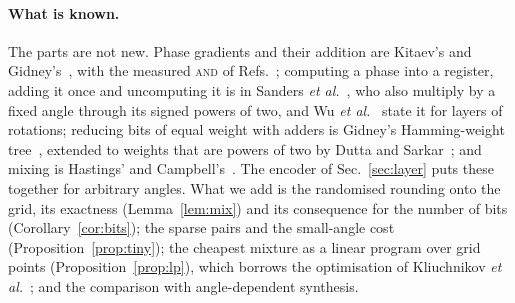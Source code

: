 \documentclass[aps,prx,twocolumn,superscriptaddress,nofootinbib,longbibliography]{revtex4-2}
\theoremstyle{remark}
\newcommand{\AND}{\textup{\textsc{and}}}
\begin{document}
\paragraph*{What is known.} The parts are not new. Phase gradients and their addition are
Kitaev's and Gidney's~\cite{Kitaev2002,Gidney2018}, with the measured \AND{} of
Refs.~\cite{Jones2013,Gidney2018}; computing a phase into a register, adding it once and
uncomputing it is in Sanders \textit{et al.}~\cite{Sanders2020}, who also multiply by a fixed
angle through its signed powers of two, and Wu \textit{et al.}~\cite{Wu2026} state it for layers
of rotations; reducing bits of equal weight with adders is Gidney's Hamming-weight
tree~\cite{Gidney2018,Kivlichan2020}, extended to weights that are powers of two by Dutta and
Sarkar~\cite{Dutta2026}; and mixing is Hastings' and Campbell's~\cite{Hastings2017,Campbell2017}.
The encoder of Sec.~\ref{sec:layer} puts these together for arbitrary angles. What we add is the
randomised rounding onto the grid, its exactness (Lemma~\ref{lem:mix}) and its consequence for
the number of bits (Corollary~\ref{cor:bits}); the sparse pairs and the small-angle cost
(Proposition~\ref{prop:tiny}); the cheapest mixture as a linear program over grid points
(Proposition~\ref{prop:lp}), which borrows the optimisation of Kliuchnikov
\textit{et al.}~\cite{Kliuchnikov2023}; and the comparison with angle-dependent synthesis.
\end{document}
